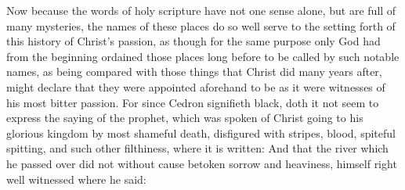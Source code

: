 \documentclass[a5paper]{scrbook}
\begin{document}
	Now because the words of holy scripture have not one sense alone, but are full of many mysteries, the names of these places do so well serve to the setting forth of this history of Christ's passion, as though for the same purpose only God had from the beginning ordained those places long before to be called by such notable names, as being compared with those things that Christ did many years after, might declare that they were appointed aforehand to be as it were witnesses of his most bitter passion. For since Cedron signifieth black, doth it not seem to express the saying of the prophet, which was spoken of Christ going to his glorious kingdom by most shameful death, disfigured with stripes, blood, spiteful spitting, and such other filthiness, where it is written:  And that the river which he passed over did not without cause betoken sorrow and heaviness, himself right well witnessed where he said: 
	
\end{document}
